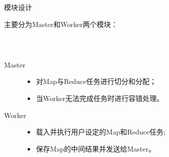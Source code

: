 \begin{frame}{\begin{CJK}{UTF8}{gkai}
			模块设计
	\end{CJK}}
	\begin{CJK}{UTF8}{gkai}
	主要分为Master和Worker两个模块：
	\end{CJK}
	\
	\newline\\
	
	\begin{columns}
		\begin{column}{0.5\textwidth}
			\begin{description} 
				\item[Master] 
					\begin{itemize}
						\item \begin{CJK}{UTF8}{gkai}
							对Map与Reduce任务进行切分和分配；
							
						\end{CJK}
						
						\item \begin{CJK}{UTF8}{gkai}
							当Worker无法完成任务时进行容错处理。
							
						\end{CJK}
					\end{itemize}
				
				\item[Worker] 
				\begin{itemize}
					\item \begin{CJK}{UTF8}{gkai}
						载入并执行用户设定的Map和Reduce任务;
						
					\end{CJK}
					
					\item \begin{CJK}{UTF8}{gkai}
						保存Map的中间结果并发送给Master。	
						
					\end{CJK}
				\end{itemize}
				

			\end{description}
		\end{column}
	

\end{columns}
\end{frame}
